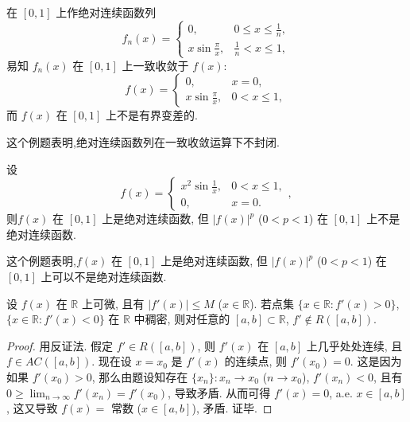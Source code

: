 \documentclass[../../main.tex]{subfiles}%
\begin{document}
\begin{example}
在 $[0,1]$ 上作绝对连续函数列
\[
f_n(x) =
\begin{cases}
0, & 0\leqslant x\leqslant \frac{1}{n}, \\
x\sin\frac{\pi}{x}, & \frac{1}{n}<x\leqslant 1,
\end{cases}
\]
易知 $f_n(x)$ 在 $[0,1]$ 上一致收敛于 $f(x)$:
\[
f(x) =
\begin{cases}
0, & x=0, \\
x\sin\frac{\pi}{x}, & 0<x\leqslant 1,
\end{cases}
\]
而 $f(x)$ 在 $[0,1]$ 上不是有界变差的.
\end{example}
\begin{remark}
这个例题表明,绝对连续函数列在一致收敛运算下不封闭.
\end{remark}

\begin{example}
设
\[
f(x) =
\begin{cases}
x^2\sin\frac{1}{x}, & 0<x\leqslant 1, \\
0, & x=0.
\end{cases},
\]
则$f(x)$ 在 $[0,1]$ 上是绝对连续函数, 但 $|f(x)|^p$ ($0<p<1$) 在 $[0,1]$ 上不是绝对连续函数.
\end{example}
\begin{remark}
这个例题表明,$f(x)$ 在 $[0,1]$ 上是绝对连续函数, 但 $|f(x)|^p$ ($0<p<1$) 在 $[0,1]$ 上可以不是绝对连续函数.
\end{remark}

\begin{example}
设 $f(x)$ 在 $\mathbb{R}$ 上可微, 且有 $|f'(x)|\leqslant M$ ($x\in\mathbb{R}$). 若点集 $\{x\in\mathbb{R}: f'(x)>0\}$, $\{x\in\mathbb{R}: f'(x)<0\}$ 在 $\mathbb{R}$ 中稠密, 则对任意的 $[a,b]\subset\mathbb{R}$, $f'\notin R([a,b])$.
\end{example}
\begin{proof}

用反证法. 假定 $f'\in R([a,b])$, 则 $f'(x)$ 在 $[a,b]$ 上几乎处处连续, 且 $f\in  AC([a,b])$. 现在设 $x=x_0$ 是 $f'(x)$ 的连续点, 则 $f'(x_0)=0$. 这是因为如果 $f'(x_0)>0$, 那么由题设知存在 $\{x_n\}: x_n\to x_0$ ($n\to x_0$), $f'(x_n)<0$, 且有 $0\geqslant \lim_{n\to\infty} f'(x_n)=f'(x_0)$, 导致矛盾. 从而可得 $f'(x)=0$, a.e. $x\in[a,b]$, 这又导致 $f(x)=$ 常数 ($x\in[a,b]$), 矛盾. 证毕.

\end{proof}
\end{document}
